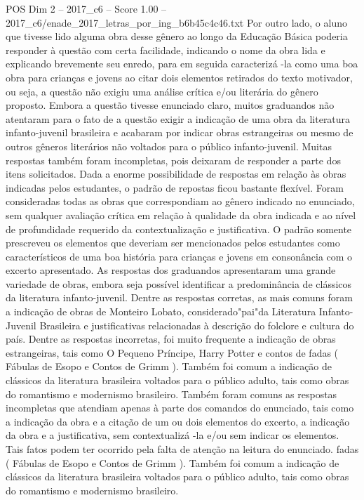 \begin{textsample}{POS Dim 2 – 2017\_c6 – Score 1.00 – 2017\_c6/enade\_2017\_letras\_por\_ing\_b6b45c4c46.txt}
Por outro lado, o aluno que tivesse lido alguma obra desse gênero ao longo da Educação Básica poderia responder à questão com certa facilidade, indicando o nome da obra lida e explicando brevemente seu enredo, para em seguida caracterizá -la como uma boa obra para crianças e jovens ao citar dois elementos retirados do texto motivador, ou seja, a questão não exigiu uma análise crítica e/ou literária do gênero proposto.
Embora a questão tivesse enunciado claro, muitos graduandos não atentaram para o fato de a questão exigir a indicação de uma obra da literatura infanto-juvenil brasileira e acabaram por indicar obras estrangeiras ou mesmo de outros gêneros literários não voltados para o público infanto-juvenil.
Muitas respostas também foram incompletas, pois deixaram de responder a parte dos itens solicitados.
Dada a enorme possibilidade de respostas em relação às obras indicadas pelos estudantes, o padrão de repostas ficou bastante flexível.
Foram consideradas todas as obras que correspondiam ao gênero indicado no enunciado, sem qualquer avaliação crítica em relação à qualidade da obra indicada e ao nível de profundidade requerido da contextualização e justificativa.
O padrão somente prescreveu os elementos que deveriam ser mencionados pelos estudantes como característicos de uma boa história para crianças e jovens em consonância com o excerto apresentado.
As respostas dos graduandos apresentaram uma grande variedade de obras, embora seja possível identificar a predominância de clássicos da literatura infanto-juvenil.
Dentre as respostas corretas, as mais comuns foram a indicação de obras de Monteiro Lobato, considerado"pai"da Literatura Infanto-Juvenil Brasileira e justificativas relacionadas à descrição do folclore e cultura do país.
Dentre as respostas incorretas, foi muito frequente a indicação de obras estrangeiras, tais como O Pequeno Príncipe, Harry Potter e contos de fadas ( Fábulas de Esopo e Contos de Grimm ).
Também foi comum a indicação de clássicos da literatura brasileira voltados para o público adulto, tais como obras do romantismo e modernismo brasileiro.
Também foram comuns as respostas incompletas que atendiam apenas à parte dos comandos do enunciado, tais como a indicação da obra e a citação de um ou dois elementos do excerto, a indicação da obra e a justificativa, sem contextualizá -la e/ou sem indicar os elementos.
Tais fatos podem ter ocorrido pela falta de atenção na leitura do enunciado. fadas ( Fábulas de Esopo e Contos de Grimm ).
Também foi comum a indicação de clássicos da literatura brasileira voltados para o público adulto, tais como obras do romantismo e modernismo brasileiro.

\end{textsample}
